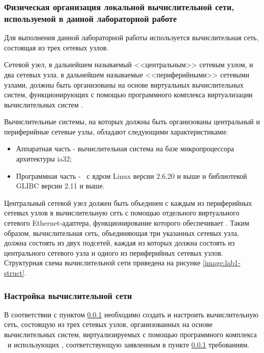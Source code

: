 
\subsubsection{Физическая организация локальной вычислительной сети, используемой в данной лабораторной работе}
	\label{lab1:lab1-net}

	Для выполнения данной лабораторной работы используется вычислительная сеть, состоящая из трех сетевых узлов.

	Сетевой узел, в дальнейшем называемый <<центральным>> сетевым узлом, и два сетевых узла, в дальнейшем называемые <<периферийными>> сетевыми узлами,
	должны быть организованы на основе виртуальных вычислительных систем, функционирующих с помощью программного комплекса
	виртуализации вычислительных систем \virtpo.

	Вычислительные системы, на которых должны быть организованы центральный и периферийные сетевые узлы,
	обладают следующими характеристиками:

	\begin{itemize}

		\item Аппаратная часть - вычислительная система на базе микропроцессора архитектуры ia32;
		\item Программная часть - \linux\ с ядром Linux версии 2.6.20 и выше и библиотекой GLIBC версии 2.11 и выше.

	\end{itemize}

	Центральный сетевой узел должен быть объединен с каждым из периферийных сетевых узлов в вычислительную сеть
	с помощью отдельного виртуального сетевого Ethernet-адаптера, функционирование которого обеспечивает \virtpo.
	Таким образом, вычислительная сеть, объединяющая три указанных сетевых узла, должна состоять из двух подсетей,
	каждая из которых должна состоять из центрального сетевого узла и одного из периферийных сетевых узлов.
	Структурная схема вычислительной сети приведена на рисунке \ref{image:lab1-struct}.


\subsubsection{Настройка вычислительной сети}
	\label{lab1:lab1-p1}

	В соответствии с пунктом \ref{lab1:lab1-net} необходимо создать и настроить вычислительную сеть, состоящую из трех сетевых узлов,
	организованных на основе вычислительных систем, виртуализируемых с помощью программного комплекса \virtpo\ и
	использующих \linux, соответствующую заявленным в пункте \ref{lab1:lab1-net} требованиям.
	
